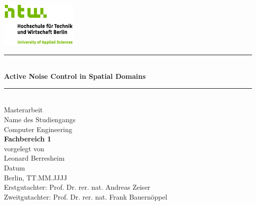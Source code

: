 \begin{titlepage}

    \begin{center}
        \includegraphics[width=0.28\textwidth,keepaspectratio]{images/htw_logo.jpg}
        \vspace{0.3cm}
        \par\noindent\rule{\textwidth}{0.4pt}
        \\
        \vspace{0.7cm}
        \LARGE
        {\color{htwgreen}
        \textbf{Active Noise Control in Spatial Domains}
        }
        \par\noindent\rule{\textwidth}{0.4pt}
        \\
        \Large
        \vspace{0.3cm}
        Masterarbeit
        \\
        \vspace{2cm}
        \small
        Name des Studiengangs
        \vspace{0.4cm}
        \\
        \Large
        Computer Engineering
        \vspace{0.4cm}
        \\
        {\color{htwgreen}
        \textbf{Fachbereich 1}
        }
        \vspace{0.4cm}
        \\
        \small
        vorgelegt von
        \vspace{0.4cm}
        \\
        \Large
        Leonard Berresheim
        \\
        \vspace{4cm}
        \small
        Datum
        \vspace{0.4cm}
        \\
        \normalsize
        Berlin, TT.MM.JJJJ
        \vspace{1.4cm}
        \\
        \Large
        Erstgutachter: Prof. Dr. rer. nat. Andreas Zeiser\\
        \vspace{0.4cm}
        Zweitgutachter: Prof. Dr. rer. nat. Frank Bauernöppel\\
        
        \vfill
    \end{center}
\end{titlepage}